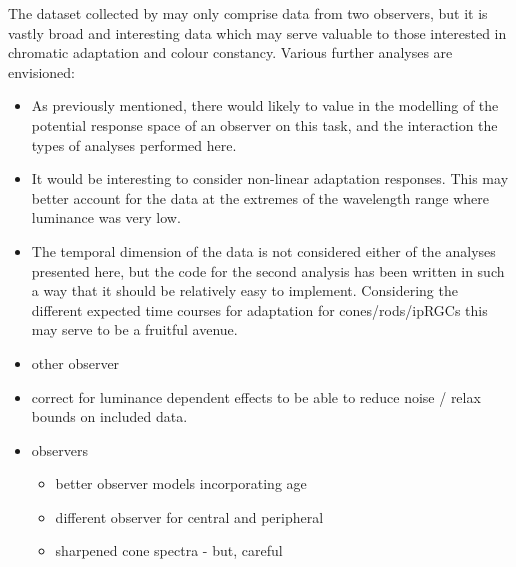 The dataset collected by \citet{macdonald_chromatic_2013} may only comprise data from two observers, but it is vastly broad and interesting data which may serve valuable to those interested in chromatic adaptation and colour constancy. Various further analyses are envisioned:
\begin{itemize}
    \item As previously mentioned, there would likely to value in the modelling of the potential response space of an observer on this task, and the interaction the types of analyses performed here.
    \item It would be interesting to consider non-linear adaptation responses. This may better account for the data at the extremes of the wavelength range where luminance was very low.
    \item The temporal dimension of the data is not considered either of the analyses presented here, but the code for the second analysis has been written in such a way that it should be relatively easy to implement. Considering the different expected time courses for adaptation for cones/rods/\glspl{ipRGC} this may serve to be a fruitful avenue.
    \item other observer %
    \item correct for luminance dependent effects to be able to reduce noise / relax bounds on included data. %
    \item observers %
    \begin{itemize}
    \item better observer models incorporating age %
    \item different observer for central and peripheral %
    \item sharpened cone spectra - but, careful
    \end{itemize}
\end{itemize}










